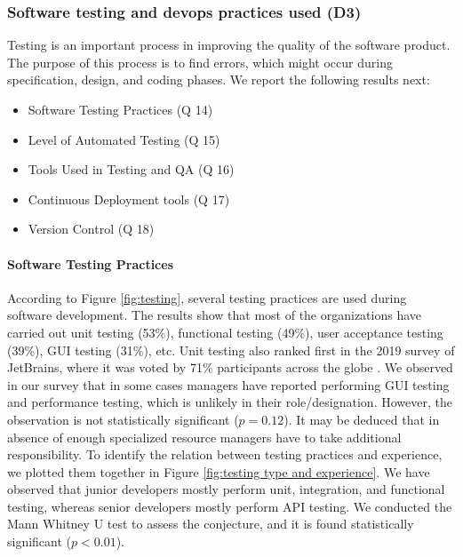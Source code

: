 \subsubsection{Software testing and devops practices used (D3)}
\label{testing_practices}

Testing is an important process in improving the quality of the software product. The purpose of this process is to find errors, which might occur during specification, design, and coding phases. We report the following results next:

\begin{itemize}
\item Software Testing Practices (Q 14)
\item Level of Automated Testing (Q 15)
\item Tools Used in Testing and QA (Q 16)
\item Continuous Deployment tools (Q 17)
\item Version Control (Q 18)
\end{itemize}


\paragraph{Software Testing Practices}
According to Figure \ref{fig:testing}, several testing practices are used during software development. The results show that most of the organizations have carried out unit testing (53\%), functional testing (49\%), user acceptance testing (39\%), GUI testing (31\%), etc. Unit testing also ranked first in the 2019 survey of JetBrains, where it was voted by 71\% participants across the globe \cite{JetBrains2019}. We observed in our survey that in some cases managers have reported performing GUI testing and performance testing, which is unlikely in their role/designation. However, the observation is not statistically significant ($p=0.12$). It may be deduced that in absence of enough specialized resource managers have to take additional responsibility. To identify the relation between testing practices and experience, we plotted them together in Figure \ref{fig:testing type and experience}. We have observed that junior developers mostly perform unit, integration, and functional testing, whereas senior developers mostly perform API testing. We conducted the Mann Whitney U test to assess the conjecture, and it is found statistically significant ($p<0.01$).

